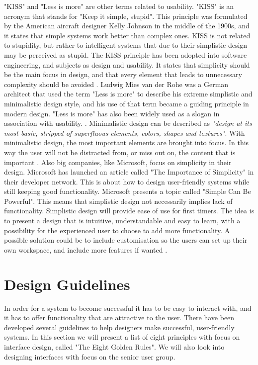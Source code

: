 "KISS" and "Less is more" are other terms related to usability. "KISS" is an acronym that stands for "Keep it simple, stupid". This principle was formulated by the American aircraft designer Kelly Johnson in the middle of the 1900s, and it states that simple systems work better than complex ones. KISS is not related to stupidity, but rather to intelligent systems that due to their simplistic design may be perceived as stupid. The KISS principle has been adopted into software engineering, and subjects as design and usability. It states that simplicity should be the main focus in design, and that every element that leads to unnecessary complexity should be avoided \cite{kiss1} \cite{kiss2}. Ludwig Mies van der Rohe was a German architect that used the term "Less is more" to describe his extreme simplistic and minimalistic design style, and his use of that term became a guiding principle in modern design. "Less is more" has also been widely used as a slogan in association with usability. \cite{rohe}. Minimalistic design can be described as \emph{"design at its most basic, stripped of superfluous elements, colors, shapes and textures"}. With minimalistic design, the most important elements are brought into focus. In this way the user will not be distracted from, or miss out on, the content that is important \cite{lessismore}. Also big companies, like Microsoft, focus on simplicity in their design. Microsoft has launched an article called "The Importance of Simplicity" in their developer network. This is about how to design user-friendly systems while still keeping good functionality. Microsoft presents a topic called "Simple Can Be Powerful". This means that simplistic design not necessarily implies lack of functionality. Simplistic design will provide ease of use for first timers. The idea is to present a design that is intuitive, understandable and easy to learn, with a possibility for the experienced user to choose to add more functionality. A possible solution could be to include customisation so the users can set up their own workspace, and include more features if wanted \cite{msdnsimple}.            
    
\section{Design Guidelines}
\label{sec:designguide}
In order for a system to become successful it has to be easy to interact with, and it has to offer functionality that are attractive to the user. There have been developed several guidelines to help designers make successful, user-friendly systems. In this section we will present a list of eight principles with focus on interface design, called "The Eight Golden Rules". We will also look into designing interfaces with focus on the senior user group. 

